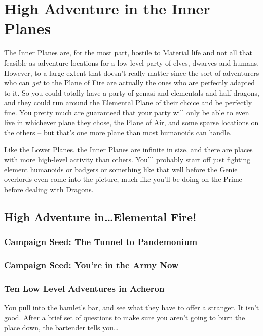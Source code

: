 \section{High Adventure in the Inner Planes}

The Inner Planes are, for the most part, hostile to Material life and not all that feasible as adventure locations for a low-level party of elves, dwarves and humans. However, to a large extent that doesn't really matter since the sort of adventurers who can \emph{get} to the Plane of Fire are actually the ones who are perfectly adapted to it. So you could totally have a party of genasi and elementals and half-dragons, and they could run around the Elemental Plane of their choice and be perfectly fine. You pretty much are guaranteed that your party will only be able to even live in whichever plane they chose, the Plane of Air, and some sparse locations on the others -- but that's one more plane than most humanoids can handle.

Like the Lower Planes, the Inner Planes are infinite in size, and there are places with more high-level activity than others. You'll probably start off just fighting element humanoids or badgers or something like that well before the Genie overlords even come into the picture, much like you'll be doing on the Prime before dealing with Dragons.


\subsection{High Adventure in\ldots Elemental Fire!}

%

\subsubsection{Campaign Seed: The Tunnel to Pandemonium}

%

\subsubsection{Campaign Seed: You're in the Army Now}

%

\subsubsection{Ten Low Level Adventures in Acheron}

You pull into the hamlet's bar, and see what they have to offer a stranger. It isn't good. After a brief set of questions to make sure you aren't going to burn the place down, the bartender tells you\ldots

